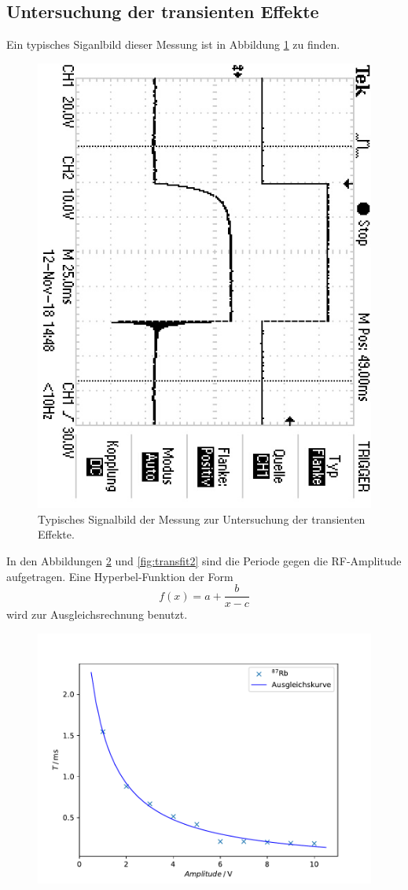 \subsection{Untersuchung der transienten Effekte}
Ein typisches Siganlbild dieser Messung ist in Abbildung \ref{fig:trans} zu finden.
\begin{figure}
  \centering
  \includegraphics[angle=90]{pics/TEK0033.JPG}
  \caption{Typisches Signalbild der Messung zur Untersuchung der transienten Effekte.}
  \label{fig:trans}
\end{figure}
In den Abbildungen \ref{fig:transfit1} und \ref{fig:transfit2} sind die Periode
gegen die RF-Amplitude aufgetragen.
Eine Hyperbel-Funktion der Form
\begin{equation}
  f(x)=a+\frac{b}{x-c}
\end{equation}
wird zur Ausgleichsrechnung benutzt.
\begin{figure}
    \centering
    \includegraphics[width=0.8\linewidth]{plots/Trans1.pdf}
    \label{fig:transfit1}
\end{figure}
